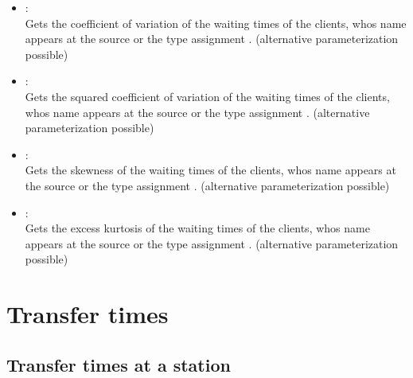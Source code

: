 \begin{itemize}
\item
{}:\\
Gets the coefficient of variation of the waiting times of the clients, whos name appears at the source or the type assignment .
(alternative parameterization possible)

\item
{}:\\
Gets the squared coefficient of variation of the waiting times of the clients, whos name appears at the source or the type assignment .
(alternative parameterization possible)

\item
{}:\\
Gets the skewness of the waiting times of the clients, whos name appears at the source or the type assignment .
(alternative parameterization possible)

\item
{}:\\
Gets the excess kurtosis of the waiting times of the clients, whos name appears at the source or the type assignment .
(alternative parameterization possible)

\end{itemize}



\section{Transfer times}



\subsection{Transfer times at a station}

